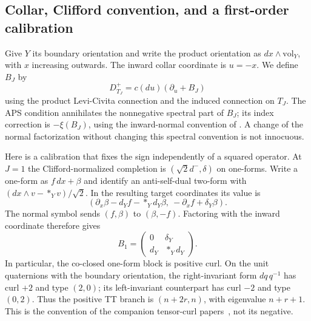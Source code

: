\documentclass[11pt]{article}
\theoremstyle{definition}
\begin{document}
\subsection{Collar, Clifford convention, and a first-order calibration}
\label{sec:collar}

Give $Y$ its boundary orientation and write the product orientation as
$dx\wedge\mathrm{vol}_Y$, with $x$ increasing outwards.  The inward collar
coordinate is $u=-x$.  We define $B_J$ by
\[
 D^+_{T_J}=c(du)(\partial_u+B_J)
\]
using the product Levi-Civita connection and the induced connection on $T_J$.
The APS condition annihilates the nonnegative spectral part of $B_J$; its
index correction is $-\xi(B_J)$, using the inward-normal convention of
\cite[Theorem~3.10, p.~57; equations~(4.1)--(4.3), pp.~60--62]{APS1975I}.
A change of the normal factorization without
changing this spectral convention is not innocuous.

Here is a calibration that fixes the sign independently of a squared
operator.  At $J=1$ the Clifford-normalized completion is
$(\sqrt{2}d^-,\delta)$ on one-forms.  Write a one-form as $f\,dx+\beta$ and
identify an anti-self-dual two-form with
$(dx\wedge v-*_Yv)/\sqrt{2}$.  In the resulting target coordinates its value is
\[
 (\partial_x\beta-d_Yf-*_Yd_Y\beta,\ -\partial_xf+\delta_Y\beta).
\]
The normal symbol sends $(f,\beta)$ to $(\beta,-f)$.  Factoring with the
inward coordinate therefore gives
\begin{equation}\label{eq:j1-collar}
 B_1=\begin{pmatrix}0&\delta_Y\\ d_Y&*_Yd_Y\end{pmatrix}.
\end{equation}
In particular, the co-closed one-form block is positive curl.  On the unit
quaternions with the boundary orientation, the right-invariant form
$dq\,q^{-1}$ has curl $+2$ and type $(2,0)$; its left-invariant counterpart
has curl $-2$ and type $(0,2)$.  Thus the positive TT branch is
$(n+2r,n)$, with eigenvalue $n+r+1$.  This is the convention of the companion
tensor-curl papers~\cite{Mahmood2026LensEta,Mahmood2026DiracToTensorCurlEtaTransfer},
not its negative.
\end{document}
